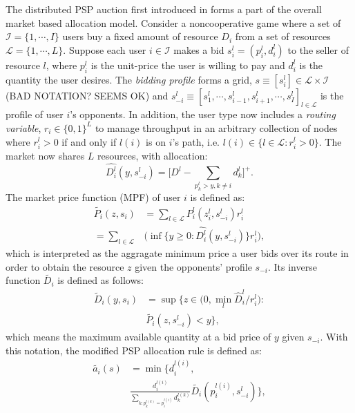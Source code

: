 \documentclass[12pt]{article}
\theoremstyle{definition}
\newcommand{\mcL}{\mathcal{L}}
\newcommand{\mcI}{\mathcal{I}}
\begin{document}
\begin{multicols}{2}
The distributed PSP auction first introduced in \cite{lazar} forms a part of the
overall market based allocation model. Consider a noncooperative game
where a set of $\mcI = \lbrace 1,\cdots,I\rbrace$ users buy a fixed
amount of resource $D_i$ from a set of resources $\mcL = \lbrace 1,\cdots,L\rbrace$. Suppose
each user $i \in \mcI$ makes a bid $s_i^l = (p_i^l, d_i^l)$ to the
seller of resource $l$,
where $p_i^l$ is the unit-price the user is willing to pay and $d_i^l$ is the
quantity the user desires. The \emph{bidding profile} forms a grid, $s \equiv
[s_i^l] \in \mcL \times \mcI$ (BAD NOTATION?
SEEMS OK)  and $s_{−i}^l \equiv [s_1^l , \cdots , s_{i−1}^l , s_{i+1}^l , \cdots
, s_I^l]_{l\in\mcL}$ is
the profile of user $i$’s opponents. In addition, the user type now includes a
\emph{routing variable}, $r_i\in\lbrace 0, 1\rbrace^L$ to manage throughput in
an arbitrary collection of nodes where $r_i^l >0$ if and only if $l(i)$ is on
$i$'s path, i.e. $l(i) \in \lbrace l\in \mcL : r_i^l >0\rbrace$. 
The market now shares $L$ resources, with allocation:
$$
    \hat{D_i^l}(y,s_{-i}^l) = \bigg\lbrack D^l -
\displaystyle\sum_{p_k^l > y, k\ne i} d_k^l\bigg\rbrack^+.
$$
The market price function (MPF) of user $i$ is defined as:
\begin{align*}
    \tilde{P_i}(z, s_i) &= \displaystyle\sum_{l\in\mcL}P_i^l(z_i^l,
s_{-i}^l)r_i^l \\
    = \displaystyle\sum_{l\in\mcL}&\bigg(\inf\bigg\lbrace y\ge 0 :
\hat{D_i^l}(y,s_{-i}^l)\bigg\rbrace r_i^l\bigg),
\end{align*}
which is interpreted as the aggragate minimum price a user bids over its route in order to obtain the
resource $z$ given the opponents’ profile $s_{−i}$. Its inverse function
$\tilde{D_i}$ is defined as follows:
\begin{align*}
    \tilde{D}_i(y, s_i) &= \sup\bigg\lbrace z\in \bigg( 0,
\min_l\hat{D}_i^l/r_i^l\bigg) : \\
    &\tilde{P_i}(z,s_{-i}^l) < y\bigg\rbrace,
\end{align*}
which means the maximum available quantity at a bid price of $y$ given
$s_{−i}$. With this notation, the modified PSP allocation rule \cite{tuffin} is defined
as:
\begin{align*}
    \tilde{a_i}(s) &= \min\big\lbrace d_i^{l(i)}, \\
 &\frac{d_i^{l(i)}}{\sum_{k:p_k^{l(k)}=p_i^{l(i)}}d_k^{l(k)}} \tilde{D_i}(p_i^{l(i)},
s_{-i}^l)\big\rbrace,
\end{align*}

\end{multicols}
\end{document}
